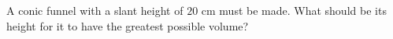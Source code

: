 
%
%
%
%
% 
% 

\question A conic funnel with a slant height of $20$ cm must be made. What should 
be its height for it to have the greatest possible volume?

\insertQR{}

\ifprintanswers
\fi 

